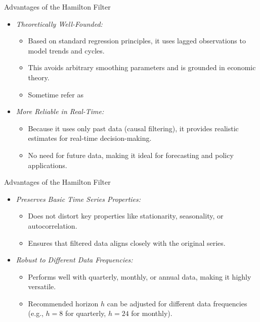 \documentclass[aspectratio=1610]{beamer}
\begin{document}
\begin{frame}[wide]{Advantages of the Hamilton Filter}
	\begin{itemize}
		\item \textit{Theoretically Well-Founded:}
		\begin{itemize}
			\item Based on standard regression principles, it uses lagged observations to model trends and cycles.
			\item This avoids arbitrary smoothing parameters and is grounded in economic theory.
			\item Sometime refer as 
		\end{itemize}
		\vspace{4mm}
		\item \textit{More Reliable in Real-Time:}
		\begin{itemize}
			\item Because it uses only past data (causal filtering), it provides realistic estimates for real-time decision-making.
			\item No need for future data, making it ideal for forecasting and policy applications.
		\end{itemize}
		
	\end{itemize}
\end{frame}


\begin{frame}[wide]{Advantages of the Hamilton Filter}
	\begin{itemize}
		\item \textit{Preserves Basic Time Series Properties:}
		\begin{itemize}
			\item Does not distort key properties like stationarity, seasonality, or autocorrelation.
			\item Ensures that filtered data aligns closely with the original series.
		\end{itemize}
		\vspace{4mm}
		\item \textit{Robust to Different Data Frequencies:}
		\begin{itemize}
			\item Performs well with quarterly, monthly, or annual data, making it highly versatile.
			\item Recommended horizon \( h \) can be adjusted for different data frequencies (e.g., \( h = 8 \) for quarterly, \( h = 24 \) for monthly).
		\end{itemize}
		
		
	\end{itemize}
\end{frame}
\end{document}
